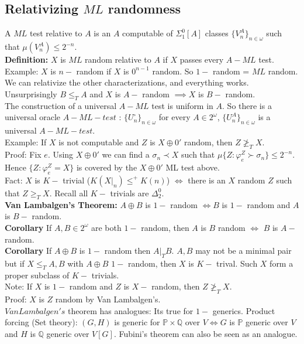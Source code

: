 \documentclass{article}
\newcommand{\bb}{\mathbb}
\begin{document}
     \subsection{Relativizing $ML$ randomness}
     A $ML$ test relative to $A$ is an $A$ computable of $\Sigma^0_1[A]$ classes $\{V_n^A\}_{n \in \omega}$ such that $\mu(V_n^A)\leq 2^{-n}$.\\
     \textbf{Definition:} $X$ is $ML$ random relative to $A$ if $X$ passes every $A-ML$ test.
     \\
     Example: $X$ is $n-$ random if $X$ is $0^{n-1}$ random. So $1-$ random = $ML$ random.\\
     We can relativize the other characterizations, and everything works.\\
     Unsurprisingly $B\leq_T A$ and $X$ is $A-$ random $\implies X$ is $B-$ random.\\
     The construction of a universal $A-ML$ test is uniform in $A$. So there is a universal oracle $A-ML-test$ : $\{U_n^\square\}_{n \in \omega}$ for every $A \in 2^\omega$, $\{U_n^A\}_{n\in \omega}$ is a universal $A-ML-test$.\\
     Example: If $X$ is not computable and $Z$ is $X\oplus 0'$ random, then $Z\not \geq_T X$.\\
     Proof: Fix $e$. Using $X \oplus 0'$ we can find a $\sigma_n \prec X$ such that $\mu\{Z: \varphi_e^Z \succ \sigma_n\} \leq 2^{-n}$. Hence $\{Z : \varphi_e^Z =X\}$ is covered by the $X \oplus 0'$ ML test above.\\
     Fact: $X$ is $K-$ trivial ($K(X|_n) \leq^+ K(n)$) $\iff$ there is an $X$ random $Z$ such that $Z \geq_T X$. Recall all $K-$ trivials are $\Delta^0_2$.\\
     \textbf{Van Lambalgen's Theorem:} $A \oplus B$ is $1-$ random $\iff B$ is $1-$ random and $A$ is $B-$ random.
     \\
     \textbf{Corollary} If $A,B \in 2^\omega$ are both $1-$ random, then $A$ is $B$ random $\iff$ $B$ is $A-$ random. \\
     \textbf{Corollary} If $A \oplus B$ is $1-$ random then $A|_T B$. $A,B$ may not be a minimal pair but if $X \leq_T A,B$ with $A \oplus B$ $1-$ random, then $X$ is $K-$ trival. Such $X$ form a proper subclass of $K-$ trivials.\\
     Note: If $X$ is $1-$ random and $Z$ is $X-$ random, then $Z \not \geq_T X$. \\
     Proof: $X$ is $Z$ random by Van Lambalgen's.\\
     $Van Lambalgen's $ theorem has analogues: Its true for $1-$ generics. Product forcing (Set theory): $(G,H) $ is generic for $\mathbb{P} \times \bb{Q}$ over $V \iff G$ is $\bb{P}$ generic over $V$ and $H$ is $\bb{Q}$ generic over $V[G]$. Fubini's theorem can also be seen as an analogue.
\end{document}
